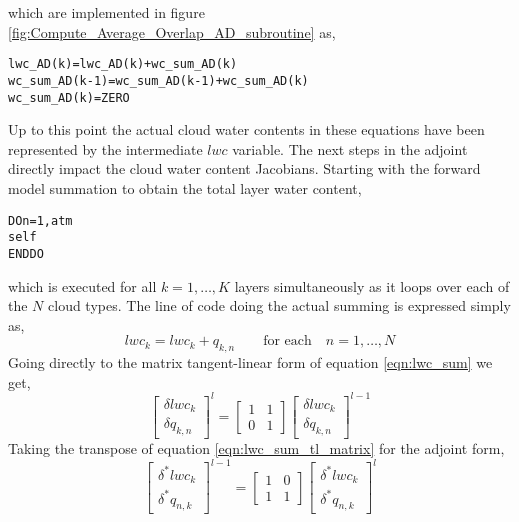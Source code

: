 which are implemented in figure \ref{fig:Compute_Average_Overlap_AD_subroutine} as,
\begin{alltt}
lwc_AD(k)      = lwc_AD(k)      + wc_sum_AD(k)
wc_sum_AD(k-1) = wc_sum_AD(k-1) + wc_sum_AD(k)
wc_sum_AD(k)   = ZERO
\end{alltt}
Up to this point the actual cloud water contents in these equations have been represented by the intermediate $lwc$ variable. The next steps in the adjoint directly impact the cloud water content Jacobians. Starting with the forward model summation to obtain the total layer water content,
\begin{alltt}
DO n = 1, atm%n_Clouds
  self%iVar%lwc = self%iVar%lwc + atm%Cloud(n)%Water_Content(1:n_layers)
END DO
\end{alltt}
which is executed for all $k = 1,\ldots,K$ layers simultaneously as it loops over each of the $N$ cloud types. The line of code doing the actual summing is expressed simply as,
\begin{equation}
  lwc_k = lwc_k + q_{k,n}\qquad\mbox{for each}\quad n = 1,\ldots,N
  \label{eqn:lwc_sum}
\end{equation}
Going directly to the matrix tangent-linear form of equation \ref{eqn:lwc_sum} we get,
\begin{equation}
  \left[ 
    \begin{array}{c}
      \delta lwc_k \\
      \delta q_{k,n}
    \end{array}
  \right]^{l} =
  \left[ 
    \begin{array}{ccc}
      1 & 1 \\
      0 & 1
    \end{array}
  \right]
  \left[ 
    \begin{array}{c}
      \delta lwc_k \\
      \delta q_{k,n}
    \end{array}
  \right]^{l-1}
  \label{eqn:lwc_sum_tl_matrix}
\end{equation}
Taking the transpose of equation \ref{eqn:lwc_sum_tl_matrix} for the adjoint form,
\begin{equation}
  \left[ 
    \begin{array}{c}
      \delta^* lwc_k \\
      \delta^* q_{n,k} 
    \end{array}
  \right]^{l-1} =
  \left[ 
    \begin{array}{ccc}
      1 & 0 \\
      1 & 1
    \end{array}
  \right]
  \left[ 
    \begin{array}{c}
      \delta^* lwc_k \\
      \delta^* q_{n,k}
    \end{array}
  \right]^{l}
  \label{eqn:lwc_sum_ad_matrix}
\end{equation}
